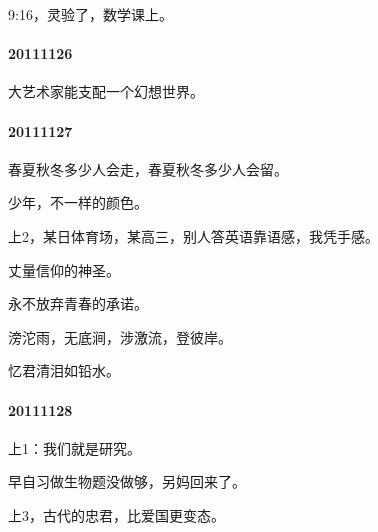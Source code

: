 \documentclass[UTF8]{book}
\begin{document}
9:16，灵验了，数学课上。


\paragraph{20111126}

大艺术家能支配一个幻想世界。


\paragraph{20111127}

春夏秋冬多少人会走，春夏秋冬多少人会留。

少年，不一样的颜色。

上2，某日体育场，某高三，别人答英语靠语感，我凭手感。

丈量信仰的神圣。

永不放弃青春的承诺。

滂沱雨，无底涧，涉激流，登彼岸。

忆君清泪如铅水。



\paragraph{20111128}

上1：我们就是研究。

早自习做生物题没做够，另妈回来了。

上3，古代的忠君，比爱国更变态。
\end{document}
